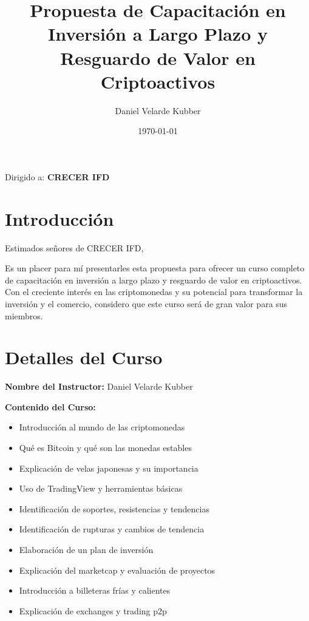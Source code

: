 \documentclass[a4paper,12pt]{article}
\title{Propuesta de Capacitación en Inversión a Largo Plazo y Resguardo de Valor en Criptoactivos}
\author{Daniel Velarde Kubber}
\date{\today}
\begin{document}
\maketitle

\noindent
Dirigido a: \textbf{CRECER IFD}

\vspace{1em}

\section*{Introducción}

Estimados señores de CRECER IFD,

Es un placer para mí presentarles esta propuesta para ofrecer un curso completo de capacitación en inversión a largo plazo y resguardo de valor en criptoactivos. Con el creciente interés en las criptomonedas y su potencial para transformar la inversión y el comercio, considero que este curso será de gran valor para sus miembros.

\vspace{1em}

\section*{Detalles del Curso}

\textbf{Nombre del Instructor:} Daniel Velarde Kubber

\textbf{Contenido del Curso:}
\begin{itemize}
    \item Introducción al mundo de las criptomonedas
    \item Qué es Bitcoin y qué son las monedas estables
    \item Explicación de velas japonesas y su importancia
    \item Uso de TradingView y herramientas básicas
    \item Identificación de soportes, resistencias y tendencias
    \item Identificación de rupturas y cambios de tendencia
    \item Elaboración de un plan de inversión
    \item Explicación del marketcap y evaluación de proyectos
    \item Introducción a billeteras frías y calientes
    \item Explicación de exchanges y trading p2p
\end{itemize}
\end{document}
